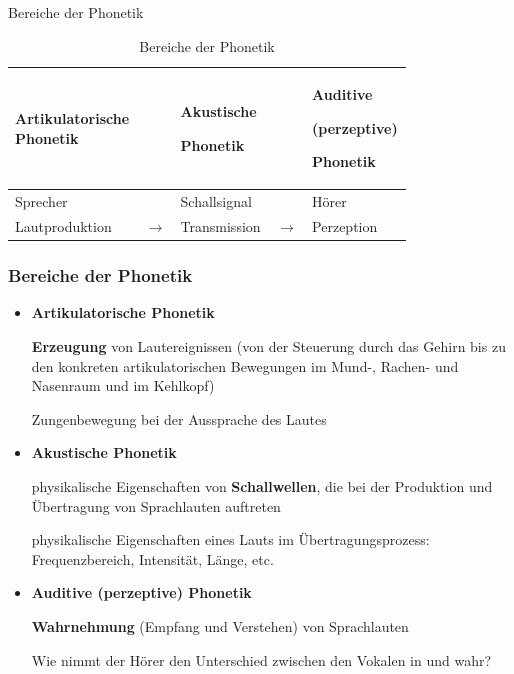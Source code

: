 
\begin{frame}{Bereiche der Phonetik}

	\begin{table}
	\centering 
	
		\begin{tabular}{p{0.23\linewidth}p{0.05\linewidth}p{0.23\linewidth}p{0.05\linewidth}p{0.23\linewidth}}
			\hline
			\textbf{Artikulatorische Phonetik} & & \textbf{Akustische}\par \textbf{Phonetik} & & \textbf{Auditive}\par \textbf{(perzeptive)}\par \textbf{Phonetik} \\
			\hline
  			Sprecher & & Schallsignal & & Hörer \\
			\hline
			Lautproduktion & $\rightarrow$ & Transmission & $\rightarrow$ & Perzeption\\
			\hline
		\end{tabular}
		
	\caption{Bereiche der Phonetik \citep{Ramers08a}} 
	\end{table}	
		
\end{frame}




\begin{frame}
\frametitle{Bereiche der Phonetik}

	\begin{itemize}
		\item \textbf{Artikulatorische Phonetik}
		
\textbf{Erzeugung} von Lautereignissen (von der Steuerung durch das Gehirn bis zu den konkreten artikulatorischen Bewegungen im Mund-, Rachen- und Nasenraum und im Kehlkopf)

			\ea Zungenbewegung bei der Aussprache des Lautes \textipa{[ \t{tS} ]}
			\z

		
		\item \textbf{Akustische Phonetik}
		
                       physikalische Eigenschaften von \textbf{Schallwellen}, die bei der Produktion und Übertragung von Sprachlauten auftreten

			\ea physikalische Eigenschaften eines Lauts im Übertragungsprozess: Frequenzbereich, Intensität, Länge, etc.
			\z
			
		\item \textbf{Auditive (perzeptive) Phonetik}
		
		      \textbf{Wahrnehmung} (Empfang und Verstehen) von Sprachlauten

			\ea Wie nimmt der Hörer den Unterschied zwischen den Vokalen in  und  wahr?
			\z
		
	\end{itemize}
	
\end{frame}



